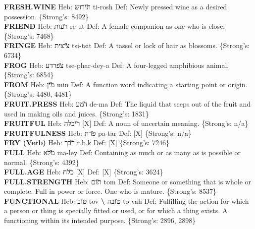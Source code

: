 {\textbf{FRESH.WINE} Heb: {\large\H תירוש} ti-rosh Def: Newly pressed wine as a desired possession. \{Strong's: 8492\}\hfill{}\\

\textbf{FRIEND} Heb: {\large\H רעות} re-ut Def: A female companion as one who is close. \{Strong's: 7468\}\hfill{}\\

\textbf{FRINGE} Heb: {\large\H ציצית} tsi-tsit Def: A tassel or lock of hair as blossoms. \{Strong's: 6734\}\hfill{}\\

\textbf{FROG} Heb: {\large\H צפרדע} tse-phar-dey-a Def: A four-legged amphibious animal. \{Strong's: 6854\}\hfill{}\\

\textbf{FROM} Heb: {\large\H מין} min Def: A function word indicating a starting point or origin. \{Strong's: 4480, 4481\}\hfill{}\\

\textbf{FRUIT.PRESS} Heb: {\large\H דמע} de-ma Def: The liquid that seeps out of the fruit and used in making oils and juices. \{Strong's: 1831\}\hfill{}\\

\textbf{FRUITFUL} Heb: {\large\H ריבלה} {[}X{]} Def: A noun of uncertain meaning. \{Strong's: n/a\}\hfill{}\\

\textbf{FRUITFULNESS} Heb: {\large\H פרת} pa-tar Def: {[}X{]} \{Strong's: n/a\}\hfill{}\\

\textbf{FRY (Verb)} Heb: {\large\H רבך} r.b.k Def: {[}X{]} \{Strong's: 7246\}\hfill{}\\

\textbf{FULL} Heb: {\large\H מלא} ma-ley Def: Containing as much or as many as is possible or normal. \{Strong's: 4392\}\hfill{}\\

\textbf{FULL.AGE} Heb: {\large\H כלח} {[}X{]} Def: {[}X{]} \{Strong's: 3624\}\hfill{}\\

\textbf{FULL.STRENGTH} Heb: {\large\H תום} tom Def: Someone or something that is whole or complete. Full in power or force. One who is mature. \{Strong's: 8537\}\hfill{}\\

\textbf{FUNCTIONAL} Heb: {\large\H טוב} tov \textbf{\textbackslash{}} {\large\H טובה} to-vah Def: Fulfilling the action for which a person or thing is specially fitted or used, or for which a thing exists. A functioning within its intended purpose. \{Strong's: 2896, 2898\}\hfill{}\\

}
